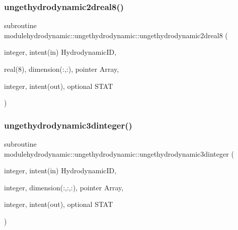 \mbox{\label{interfacemodulehydrodynamic_1_1ungethydrodynamic_a21ff612d82daa5460e0d92a1e2cf4ac7}} 
\subsubsection{\texorpdfstring{ungethydrodynamic2dreal8()}{ungethydrodynamic2dreal8()}}
{\footnotesize\ttfamily subroutine modulehydrodynamic\+::ungethydrodynamic\+::ungethydrodynamic2dreal8 (\begin{DoxyParamCaption}\item[{integer, intent(in)}]{Hydrodynamic\+ID,  }\item[{real(8), dimension(\+:,\+:), pointer}]{Array,  }\item[{integer, intent(out), optional}]{S\+T\+AT }\end{DoxyParamCaption})\hspace{0.3cm}{\ttfamily [private]}}

\mbox{\label{interfacemodulehydrodynamic_1_1ungethydrodynamic_a921bf9911a0a3c95110658cdd69a2dec}} 
\subsubsection{\texorpdfstring{ungethydrodynamic3dinteger()}{ungethydrodynamic3dinteger()}}
{\footnotesize\ttfamily subroutine modulehydrodynamic\+::ungethydrodynamic\+::ungethydrodynamic3dinteger (\begin{DoxyParamCaption}\item[{integer, intent(in)}]{Hydrodynamic\+ID,  }\item[{integer, dimension(\+:,\+:,\+:), pointer}]{Array,  }\item[{integer, intent(out), optional}]{S\+T\+AT }\end{DoxyParamCaption})\hspace{0.3cm}{\ttfamily [private]}}

